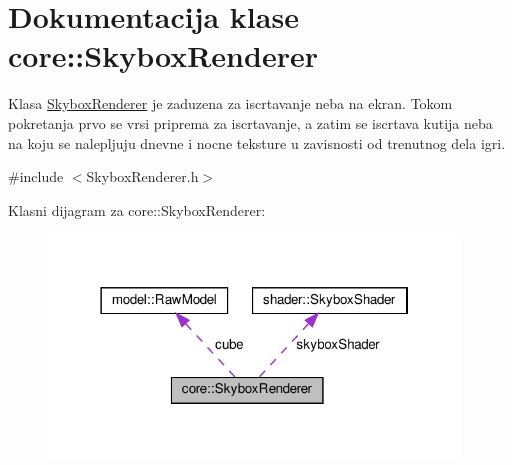 \hypertarget{classcore_1_1SkyboxRenderer}{}\section{Dokumentacija klase core\+:\+:Skybox\+Renderer}
\label{classcore_1_1SkyboxRenderer}


Klasa \hyperlink{classcore_1_1SkyboxRenderer}{Skybox\+Renderer} je zaduzena za iscrtavanje neba na ekran. Tokom pokretanja prvo se vrsi priprema za iscrtavanje, a zatim se iscrtava kutija neba na koju se nalepljuju dnevne i nocne teksture u zavisnosti od trenutnog dela igri.  




{\ttfamily \#include $<$Skybox\+Renderer.\+h$>$}



Klasni dijagram za core\+:\+:Skybox\+Renderer\+:
\nopagebreak
\begin{figure}[H]
\begin{center}
\leavevmode
\includegraphics[width=310pt]{classcore_1_1SkyboxRenderer__coll__graph}
\end{center}
\end{figure}
